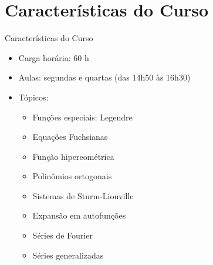 \documentclass[
size=17pt,
paper=smartboard,
mode=present,
display=slidesnotes,
style=paintings,
nopagebreaks,
blackslide,
fleqn]{powerdot}
\begin{document}
   \section[ slide = false ]{Características do Curso}
      \begin{slide}[toc=]{Características do Curso}
         \begin{itemize}
            \item Carga horária: 60 h
            \item Aulas: segundas e quartas (das 14h50 às 16h30)
            \item Tópicos:
            \begin{itemize}
               \item Funções especiais: Legendre
               \item Equações Fuchsianas
               \item Função hipereométrica
               \item Polinômios ortogonais
	       \item Sistemas de Sturm-Liouville
               \item Expansão em autofunções
               \item Séries de Fourier
	       \item Séries generalizadas
            \end{itemize}
         \end{itemize}         
      \end{slide}
      
\end{document}
